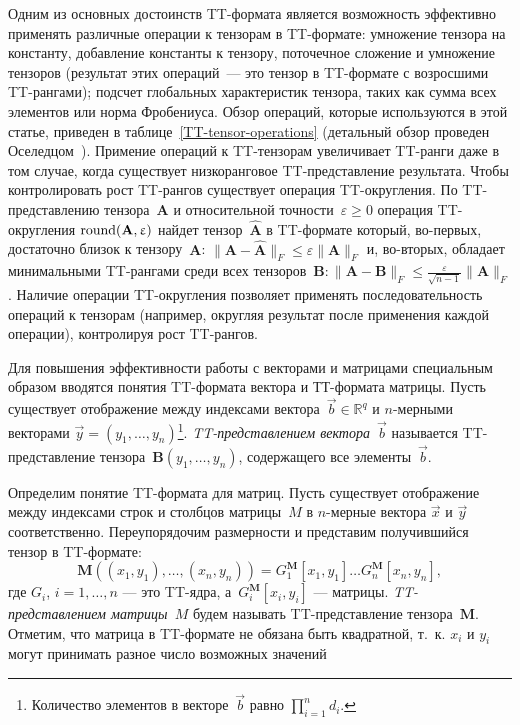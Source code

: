 Одним из основных достоинств TT\hyp{}формата является возможность эффективно применять различные операции к тензорам в TT\hyp{}формате:
умножение тензора на константу, добавление константы к тензору, поточечное сложение и умножение тензоров (результат этих операций~--- это тензор в TT\hyp{}формате с возросшими TT\hyp{}рангами); подсчет глобальных характеристик тензора, таких как сумма всех элементов или норма Фробениуса. Обзор операций, которые используются в этой статье, приведен в таблице~\ref{TT-tensor-operations} (детальный обзор проведен Оселедцом~\cite{oseledets2011ttMain}).
Примение операций к TT\hyp{}тензорам увеличивает TT\hyp{}ранги даже в том случае, когда существует низкоранговое TT\hyp{}представление результата. Чтобы контролировать рост TT\hyp{}рангов существует операция TT\hyp{}округления.
По TT\hyp{}представлению тензора~$\mathbf{A}$ и относительной точности~$\varepsilon \geq 0$ операция TT\hyp{}округления $\operatorname{round}(\mathbf{A},\upvarepsilon)$ найдет тензор~$\widehat{\mathbf{A}}$ в TT\hyp{}формате который, во-первых, достаточно близок к тензору~$\mathbf{A}$: $\| \mathbf{A} - \mathbf{\widehat{A}} \|_F \leq \varepsilon  \| \mathbf{A}  \|_F$ и, во-вторых, обладает минимальными TT\hyp{}рангами среди всех тензоров~$\mathbf{B}: \| \mathbf{A} - \mathbf{B} \|_F \leq \frac{\varepsilon}{\sqrt{n - 1}}  \| \mathbf{A}  \|_F$. Наличие операции TT\hyp{}округления позволяет применять последовательность операций к тензорам (например, округляя результат после применения каждой операции), контролируя рост TT\hyp{}рангов.


Для повышения эффективности работы с векторами и матрицами специальным образом вводятся понятия TT\hyp{}формата вектора и ТТ\hyp{}формата матрицы.
Пусть существует отображение между индексами вектора~$\vec{b}\in\mathbb{R}^q$ и $n$-мерными векторами $\vec{y} = (y_1, \dots, y_n)$\footnote{
Количество элементов в векторе~$\vec{b}$ равно $\prod_{i = 1}^n d_i$.
}.
\emph{TT\hyp{}представлением вектора~$\vec{b}$} называется TT\hyp{}представление тензора~$\mathbf{B}(y_1, \dots, y_n)$, содержащего все элементы~$\vec{b}$.


Определим понятие TT\hyp{}формата для матриц. Пусть существует отображение между индексами строк и столбцов матрицы~$M$ в $n$-мерные вектора $\vec{x}$ и $\vec{y}$ соответственно. Переупорядочим размерности и представим получившийся тензор в TT\hyp{}формате:
\begin{equation*}
\mathbf{M}((x_1, y_1),\ldots,(x_n,y_n))=G_1^{\mathbf{M}}[x_1,y_1]\dots G_n^{\mathbf{M}}[x_n,y_n],
\end{equation*}
где $G_i$, $i = 1,\dots,n$ --- это TT\hyp{}ядра, а~$G_i^{\mathbf{M}}[x_i,y_i]$ --- матрицы. \emph{TT\hyp{}представлением матрицы~$M$} будем называть TT\hyp{}представление тензора~$\mathbf{M}$. Отметим, что матрица в TT\hyp{}формате не обязана быть квадратной, т.~к. $x_i$ и $y_i$ могут принимать разное число возможных значений


